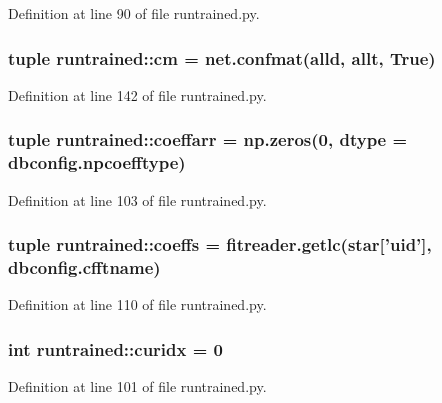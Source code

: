 Definition at line 90 of file runtrained.py.

\hypertarget{namespaceruntrained_ae78e84f04d590cfe2564b1a02853e08c}{
\subsubsection[{cm}]{\setlength{\rightskip}{0pt plus 5cm}tuple {\bf runtrained::cm} = net.confmat(alld, allt, True)}}
\label{namespaceruntrained_ae78e84f04d590cfe2564b1a02853e08c}


Definition at line 142 of file runtrained.py.

\hypertarget{namespaceruntrained_a52fa48450cb7cb0673f11611f1d49ca8}{
\subsubsection[{coeffarr}]{\setlength{\rightskip}{0pt plus 5cm}tuple {\bf runtrained::coeffarr} = np.zeros(0, dtype = dbconfig.npcoefftype)}}
\label{namespaceruntrained_a52fa48450cb7cb0673f11611f1d49ca8}


Definition at line 103 of file runtrained.py.

\hypertarget{namespaceruntrained_a59a01d66886c51ec3cba425426d38f62}{
\subsubsection[{coeffs}]{\setlength{\rightskip}{0pt plus 5cm}tuple {\bf runtrained::coeffs} = fitreader.getlc(star\mbox{[}'uid'\mbox{]}, dbconfig.cfftname)}}
\label{namespaceruntrained_a59a01d66886c51ec3cba425426d38f62}


Definition at line 110 of file runtrained.py.

\hypertarget{namespaceruntrained_ab5617d20b9cf0b904a46b74e9584f3c9}{
\subsubsection[{curidx}]{\setlength{\rightskip}{0pt plus 5cm}int {\bf runtrained::curidx} = 0}}
\label{namespaceruntrained_ab5617d20b9cf0b904a46b74e9584f3c9}


Definition at line 101 of file runtrained.py.

